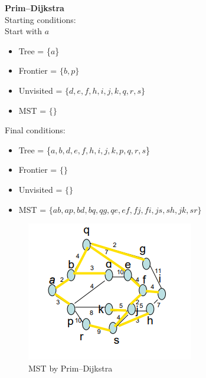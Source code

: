\documentclass{article}
\begin{document}
\begin{enumerate}
    \textbf{Prim–Dijkstra}\\
    Starting conditions:\\
    Start with $a$
    \begin{itemize}
        \item Tree = \{$a$\}
        \item Frontier = $\{b, p\}$
        \item Unvisited = $\{d, e, f, h, i, j, k, q, r, s \}$
        \item MST = $\{\}$
    \end{itemize}
    Final conditions:
    \begin{itemize}
        \item Tree = \{$a, b, d, e, f, h, i, j, k, p, q, r, s$\}
        \item Frontier = $\{\}$
        \item Unvisited = $\{\}$
        \item MST = $\{ab, ap, bd, bq, qg, qe, ef, fj, fi, js, sh, jk, sr\}$
    \end{itemize}

    \begin{figure}[ht]
        \centering
        \includegraphics{Hw8/R2.png}
        \caption{MST by Prim–Dijkstra}
        \label{graph3}
    \end{figure}


\end{enumerate}
\end{document}

